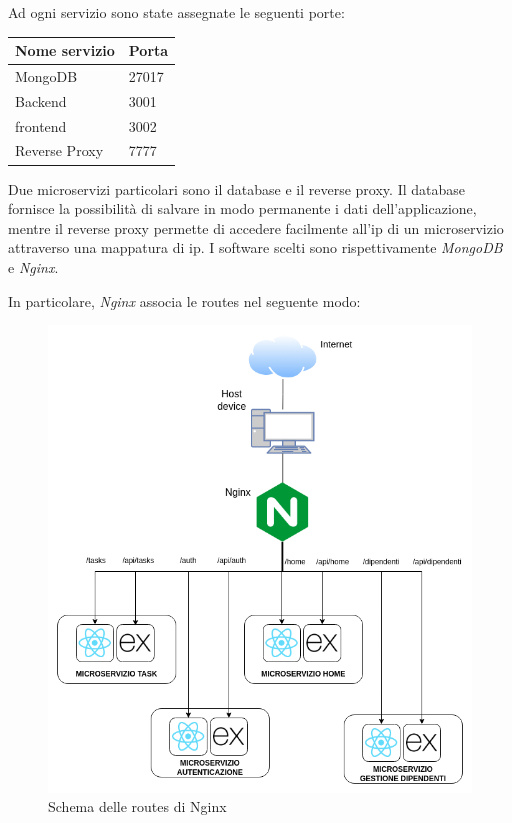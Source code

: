 \documentclass{report}
\begin{document}
Ad ogni servizio sono state assegnate le seguenti porte:

\begin{center} %
	\centering
	\begin{tabular}{ |p{4cm}|p{4cm}|  }
		\hline
		\centering Nome servizio & \qquad\qquad Porta \\ %
		\hline
		MongoDB & 27017 \\
		\hline
		Backend & 3001 \\
		\hline
		frontend & 3002 \\
		\hline
		Reverse Proxy & 7777 \\
		\hline
	\end{tabular}
\end{center}

Due microservizi particolari sono il database e il reverse proxy. Il database fornisce la possibilità di salvare in modo permanente i dati dell'applicazione, mentre il reverse proxy permette di accedere facilmente all'ip di un microservizio attraverso una mappatura di ip. I software scelti sono rispettivamente \textit{MongoDB} e \textit{Nginx}.

In particolare, \textit{Nginx} associa le routes nel seguente modo:
\begin{figure}[H]
	\centering\includegraphics[width=1\textwidth]{images/nginx.png}
	Schema delle routes di Nginx
\end{figure}
\end{document}
